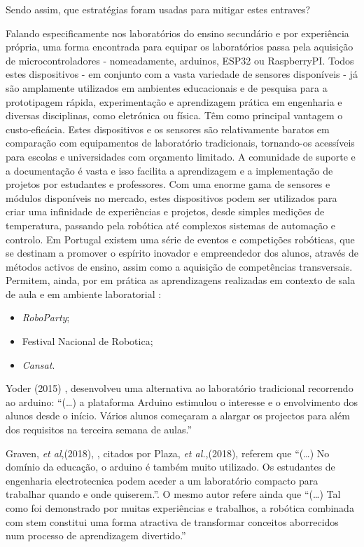 Sendo assim, que estratégias foram usadas para mitigar estes entraves?

Falando especificamente nos laboratórios do ensino secundário e por experiência própria, uma forma encontrada para equipar os laboratórios passa pela aquisição de \acrfull{microcontroladores} -  nomeadamente, \gls{arduino}s, \gls{ESP32} ou \gls{RaspberryPI}. Todos estes dispositivos - em conjunto com a vasta variedade de sensores disponíveis - já são amplamente utilizados em ambientes educacionais e de pesquisa para a prototipagem rápida, experimentação e aprendizagem prática em engenharia e diversas disciplinas, como eletrónica ou física. Têm como principal vantagem o custo-eficácia. Estes dispositivos e os sensores são relativamente baratos em comparação com equipamentos de laboratório tradicionais, tornando-os acessíveis para escolas e universidades com orçamento limitado. A comunidade de suporte e a documentação é vasta e isso facilita a aprendizagem e a implementação de projetos por estudantes e professores. Com uma enorme gama de sensores e módulos disponíveis no mercado, estes dispositivos podem ser utilizados para criar uma infinidade de experiências e projetos, desde simples medições de temperatura, passando pela robótica até complexos sistemas de automação e controlo. 
Em Portugal existem uma série de eventos e competições robóticas, que se destinam a promover o espírito inovador e empreendedor dos alunos, através de métodos activos de ensino, assim como a aquisição de competências transversais. Permitem, ainda, por em prática as aprendizagens realizadas em contexto de sala de aula e em ambiente laboratorial \cite{roboparty}\cite{fnr}\cite{cansat}:
\begin{itemize}
    \item \textit{RoboParty};
    \item Festival Nacional de Robotica;
    \item \textit{Cansat}.
\end{itemize}

Yoder (2015) \cite{yoder}, desenvolveu uma alternativa ao laboratório tradicional recorrendo ao \gls{arduino}: ``(\dots) a plataforma Arduino estimulou o interesse e o envolvimento dos alunos desde o início. Vários alunos começaram a alargar os projectos para além dos requisitos na terceira semana de aulas.''

Graven, \textit{et al},(2018), \cite{graven}, citados por Plaza, \textit{et al.},(2018), \cite{plaza} referem que ``(\ldots) No domínio da educação, o \gls{arduino} é também muito utilizado. Os estudantes de engenharia electrotecnica podem aceder a um laboratório compacto para trabalhar quando e onde quiserem.''. O mesmo autor refere ainda que ``(\ldots) Tal como foi demonstrado por muitas experiências e trabalhos, a robótica combinada com \acrshort{stem} constitui uma forma atractiva de transformar conceitos aborrecidos num processo de aprendizagem divertido.''

